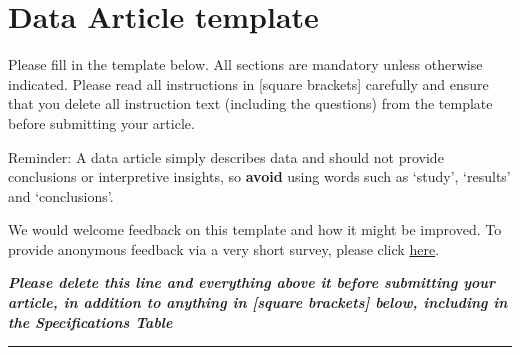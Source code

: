 \documentclass[times,final]{elsarticle.cls}
\begin{document}
\clearpage
\hypertarget{target2}{}
\section*{Data Article template}
\noindent
Please fill in the template below. All sections are mandatory unless
otherwise indicated. Please read all instructions in [square brackets]
carefully and ensure that you delete all instruction text (including
the questions) from the template before submitting your article. 

\vskip6pt\noindent
Reminder: A data article simply describes data and should not provide
conclusions or interpretive insights, so \textbf{avoid} using words such as
`study', `results' and `conclusions'.  

\vskip6pt\noindent
We would welcome feedback on this template and how it might be
improved. To provide anonymous feedback via a very short survey, please
click \href{https://forms.office.com/Pages/ResponsePage.aspx?id=P-50kiWUCUGif5-xXBBnXTeXkbO343VFrbpYVBvxdZtUM05UVjIwM0U4WlRKUldCOTNMRUQwOVRHTy4u}%
{here}. 

\vskip6pt\noindent
{\small\textbf{\textit{Please delete this line and everything above it before submitting your
article, in addition to anything in [square brackets] below, including
in the Specifications Table}}\vskip6pt\hrule\vskip12pt}
\end{document}
